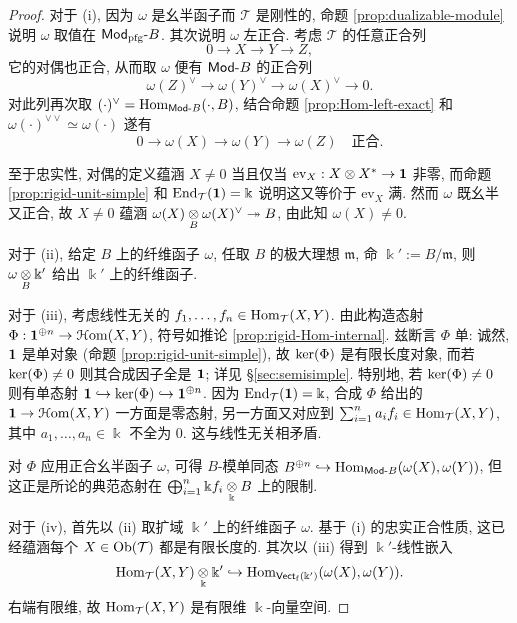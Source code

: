\begin{proof}
	对于 (i), 因为 $\omega$ 是幺半函子而 $\mathcal{T}$ 是刚性的, 命题 \ref{prop:dualizable-module} 说明 $\omega$ 取值在 $\mathsf{Mod}_{\mathrm{pfg}}\text{-}B$. 其次说明 $\omega$ 左正合. 考虑 $\mathcal{T}$ 的任意正合列
	\[ 0 \to X \to Y \to Z, \]
	它的对偶也正合, 从而取 $\omega$ 便有 $\mathsf{Mod}\text{-}B$ 的正合列
	\[ \omega(Z)^\vee \to \omega(Y)^\vee \to \omega(X)^\vee \to 0. \]
	对此列再次取 $(\cdot)^\vee = \operatorname{Hom}_{\mathsf{Mod}\text{-}B}(\cdot, B)$, 结合命题 \ref{prop:Hom-left-exact} 和 $\omega(\cdot)^{\vee\vee} \simeq \omega(\cdot)$ 遂有
	\[ 0 \to \omega(X) \to \omega(Y) \to \omega(Z) \quad \text{正合}. \]
	
	至于忠实性, 对偶的定义蕴涵 $X \neq 0$ 当且仅当 $\mathrm{ev}_X: X \otimes X^* \to \bm{1}$ 非零, 而命题 \ref{prop:rigid-unit-simple} 和 $\operatorname{End}_{\mathcal{T}}(\bm{1}) = \Bbbk$ 说明这又等价于 $\mathrm{ev}_X$ 满. 然而 $\omega$ 既幺半又正合, 故 $X \neq 0$ 蕴涵 $\omega(X) \underset{B}{\otimes} \omega(X)^\vee \twoheadrightarrow B$, 由此知 $\omega(X) \neq 0$.
	
	对于 (ii), 给定 $B$ 上的纤维函子 $\omega$, 任取 $B$ 的极大理想 $\mathfrak{m}$, 命 $\Bbbk' := B/\mathfrak{m}$, 则 $\omega \underset{B}{\otimes} \Bbbk'$ 给出 $\Bbbk'$ 上的纤维函子.
	
	对于 (iii), 考虑线性无关的 $f_1, \ldots, f_n \in \operatorname{Hom}_{\mathcal{T}}(X, Y)$. 由此构造态射 $\Phi: \bm{1}^{\oplus n} \to \EuScript{H}\mathrm{om}(X, Y)$, 符号如推论 \ref{prop:rigid-Hom-internal}. 兹断言 $\Phi$ 单: 诚然, $\bm{1}$ 是单对象 (命题 \ref{prop:rigid-unit-simple}), 故 $\operatorname{ker}(\Phi)$ 是有限长度对象, 而若 $\operatorname{ker}(\Phi) \neq 0$ 则其合成因子全是 $\bm{1}$; 详见 \S\ref{sec:semisimple}. 特别地, 若 $\operatorname{ker}(\Phi) \neq 0$ 则有单态射 $\bm{1} \hookrightarrow \operatorname{ker}(\Phi) \hookrightarrow \bm{1}^{\oplus n}$. 因为 $\operatorname{End}_{\mathcal{T}}(\bm{1}) = \Bbbk$, 合成 $\Phi$ 给出的 $\bm{1} \to \EuScript{H}\mathrm{om}(X, Y)$ 一方面是零态射, 另一方面又对应到 $\sum_{i=1}^n a_i f_i \in \operatorname{Hom}_{\mathcal{T}}(X, Y)$, 其中 $a_1, \ldots, a_n \in \Bbbk$ 不全为 $0$. 这与线性无关相矛盾.
	
	对 $\Phi$ 应用正合幺半函子 $\omega$, 可得 $B$-模单同态 $B^{\oplus n} \hookrightarrow \operatorname{Hom}_{\mathsf{Mod}\text{-}B}(\omega(X), \omega(Y))$, 但这正是所论的典范态射在 $\bigoplus_{i=1}^n \Bbbk f_i \underset{\Bbbk}{\otimes} B$ 上的限制.
	
	对于 (iv), 首先以 (ii) 取扩域 $\Bbbk'$ 上的纤维函子 $\omega$. 基于 (i) 的忠实正合性质, 这已经蕴涵每个 $X \in \operatorname{Ob}(\mathcal{T})$ 都是有限长度的. 其次以 (iii) 得到 $\Bbbk'$-线性嵌入
	\[ \operatorname{Hom}_{\mathcal{T}}(X, Y) \underset{\Bbbk}{\otimes} \Bbbk' \hookrightarrow \operatorname{Hom}_{\mathsf{Vect}_{\mathrm{f}}(\Bbbk')}(\omega(X), \omega(Y)). \]
	右端有限维, 故 $\operatorname{Hom}_{\mathcal{T}}(X, Y)$ 是有限维 $\Bbbk$-向量空间.
\end{proof}

